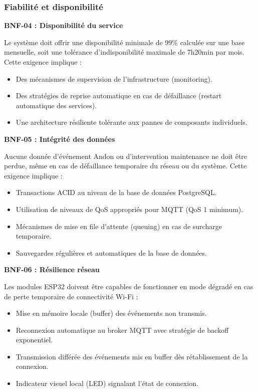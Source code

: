 \subsubsection{Fiabilité et disponibilité}

\textbf{BNF-04 : Disponibilité du service}

Le système doit offrir une disponibilité minimale de 99\% calculée sur une base mensuelle, soit une tolérance d'indisponibilité maximale de 7h20min par mois. Cette exigence implique :

\begin{itemize}
    \item Des mécanismes de supervision de l'infrastructure (monitoring).
    \item Des stratégies de reprise automatique en cas de défaillance (restart automatique des services).
    \item Une architecture résiliente tolérante aux pannes de composants individuels.
\end{itemize}


\textbf{BNF-05 : Intégrité des données}

Aucune donnée d'événement Andon ou d'intervention maintenance ne doit être perdue, même en cas de défaillance temporaire du réseau ou du système. Cette exigence implique :

\begin{itemize}
    \item Transactions ACID au niveau de la base de données PostgreSQL.
    \item Utilisation de niveaux de QoS appropriés pour MQTT (QoS 1 minimum).
    \item Mécanismes de mise en file d'attente (queuing) en cas de surcharge temporaire.
    \item Sauvegardes régulières et automatiques de la base de données.
\end{itemize}

\textbf{BNF-06 : Résilience réseau}

Les modules ESP32 doivent être capables de fonctionner en mode dégradé en cas de perte temporaire de connectivité Wi-Fi :

\begin{itemize}
    \item Mise en mémoire locale (buffer) des événements non transmis.
    \item Reconnexion automatique au broker MQTT avec stratégie de backoff exponentiel.
    \item Transmission différée des événements mis en buffer dès rétablissement de la connexion.
    \item Indicateur visuel local (LED) signalant l'état de connexion.
\end{itemize}

